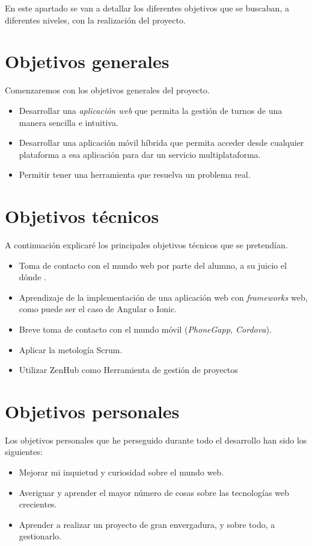 
En este apartado se van a detallar los diferentes objetivos que se buscaban, a diferentes niveles, con la realización del proyecto.

\section{Objetivos generales}\label{objetivos-generales}
Comenzaremos con los objetivos generales del proyecto. 
\begin{itemize}
\tightlist
\item
  Desarrollar una  \emph{aplicación web} que permita la gestión de turnos de una manera sencilla e intuitiva. 
\item
  Desarrollar una aplicación móvil híbrida que permita acceder desde cualquier plataforma a esa aplicación para dar un servicio multiplataforma. 
\item
  Permitir tener una herramienta que resuelva un problema real.
\end{itemize}

\section{Objetivos técnicos}\label{objetivos-tecnicos}
A continuación explicaré los principales objetivos técnicos que se pretendían. 
\begin{itemize}
\tightlist
\item
  Toma de contacto con el mundo web por parte del alumno, a su juicio el dónde . 
 \item
  Aprendizaje de la implementación de una aplicación web con  \emph{frameworks} web, como puede ser el caso de Angular o Ionic. 
\item
  Breve toma de contacto con el mundo móvil (\emph{PhoneGapp, Cordova}).
\item
 Aplicar la metología Scrum.
 \item
 Utilizar ZenHub como Herramienta de gestión de proyectos
\end{itemize}

\section{Objetivos personales}\label{objetivos-personales}
Los objetivos personales que he perseguido durante todo el desarrollo han sido los siguientes:
\begin{itemize}
\tightlist
\item
  Mejorar mi inquietud y curiosidad sobre el mundo web. 
\item
  Averiguar y aprender el mayor número de cosas sobre las tecnologías web crecientes. 
\item
  Aprender a realizar un proyecto de gran envergadura, y sobre todo, a gestionarlo.
\end{itemize}

